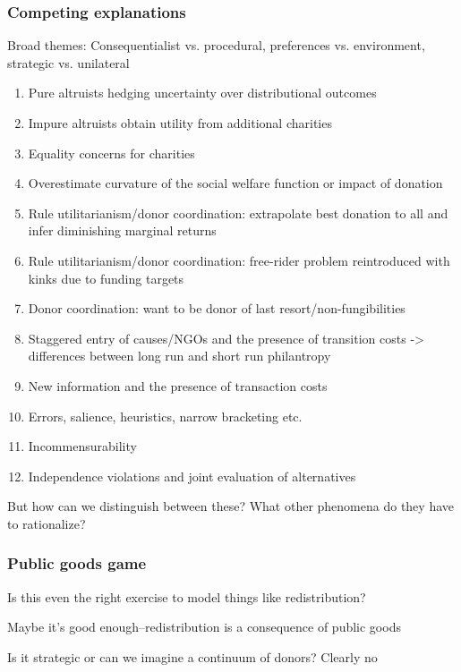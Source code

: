 \documentclass[aspectratio=169]{beamer}
\newenvironment{wideitemize}{\itemize\addtolength{\itemsep}{10pt}}{\enditemize}
\begin{document}
\begin{frame}[fragile] \frametitle{Competing explanations}

    Broad themes: Consequentialist vs. procedural, preferences vs. environment, strategic vs. unilateral

	\begin{enumerate}
        \item Pure altruists hedging uncertainty over distributional outcomes
		\item Impure altruists obtain utility from additional charities
        \item Equality concerns for charities
        \item Overestimate curvature of the social welfare function or impact of donation
        \item Rule utilitarianism/donor coordination: extrapolate best donation to all and infer diminishing marginal returns
        \item Rule utilitarianism/donor coordination: free-rider problem reintroduced with kinks due to funding targets
        \item Donor coordination: want to be donor of last resort/non-fungibilities
        \item Staggered entry of causes/NGOs and the presence of transition costs -> differences between long run and short run philantropy
        \item New information and the presence of transaction costs
        \item Errors, salience, heuristics, narrow bracketing etc.
        \item Incommensurability
        \item Independence violations and joint evaluation of alternatives
	\end{enumerate}

    But how can we distinguish between these? What other phenomena do they have to rationalize?

\end{frame}

\begin{frame}[fragile] \frametitle{Public goods game}

    \begin{wideitemize}
        \item Is this even the right exercise to model things like redistribution?
        \item Maybe it's good enough--redistribution is a consequence of public goods
        \item Is it strategic or can we imagine a continuum of donors? Clearly no
    \end{wideitemize}

\end{frame}
\end{document}
